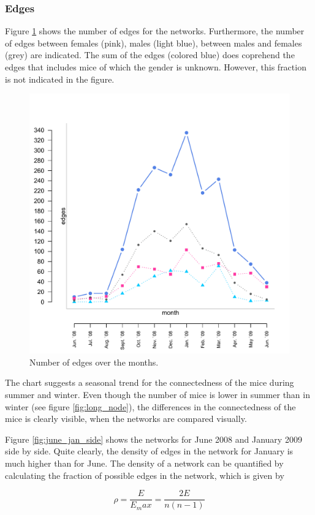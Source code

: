 \subsubsection*{Edges}

Figure \ref{fig:long_edges} shows the number of edges for the networks. Furthermore, the number of edges between females (pink), males (light blue), between males and females (grey) are indicated. The sum of the edges (colored blue) does coprehend the edges that includes mice of which the gender is unknown. However, this fraction is not indicated in the figure.

\begin{figure}[htpb]
\begin{center}
  \includegraphics[width=.6\textwidth]{assets/pdf/long_edges.pdf}
  \caption[Number of edges over the months]{Number of edges over the months.}
  \label{fig:long_edges}
\end{center}
\end{figure}

The chart suggests a seasonal trend for the connectedness of the mice during summer and winter. Even though the number of mice is lower in summer than in winter (see figure \ref{fig:long_node}), the differences in the connectedness of the mice is clearly visible, when the networks are compared visually. 

Figure \ref{fig:june_jan_side} shows the networks for June 2008 and January 2009 side by side. Quite clearly, the density of edges in the network for January is much higher than for June. The density of a network can be quantified by calculating the fraction of possible edges in the network, which is given by 

\begin{equation}
\rho = \frac{E}{E_max} = \frac{2E}{n(n-1)}
\label{eq:ass_coeff}
\end{equation}      

